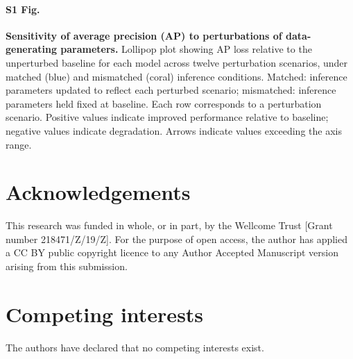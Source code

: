 \documentclass[10pt,letterpaper]{article}
\begin{document}
\paragraph*{S1 Fig.}
\label{par:S1_Fig}
\textbf{Sensitivity of average precision (AP) to perturbations of data-generating parameters.}
Lollipop plot showing AP loss relative to the unperturbed baseline for each model across twelve perturbation scenarios, under matched (blue) and mismatched (coral) inference conditions. Matched: inference parameters updated to reflect each perturbed scenario; mismatched: inference parameters held fixed at baseline. Each row corresponds to a perturbation scenario. Positive values indicate improved performance relative to baseline; negative values indicate degradation. Arrows indicate values exceeding the axis range.

\section*{Acknowledgements}
This research was funded in whole, or in part, by the Wellcome Trust [Grant number 218471/Z/19/Z]. For the purpose of open access, the author has applied a CC BY public copyright licence to any Author Accepted Manuscript version arising from this submission.

\section*{Competing interests}
The authors have declared that no competing interests exist.

\nolinenumbers



\end{document}
